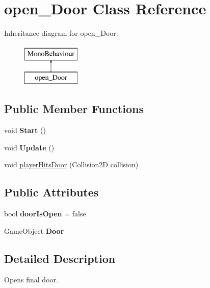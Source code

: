 \hypertarget{classopen___door}{}\section{open\+\_\+\+Door Class Reference}
\label{classopen___door}
Inheritance diagram for open\+\_\+\+Door\+:\begin{figure}[H]
\begin{center}
\leavevmode
\includegraphics[height=2.000000cm]{classopen___door}
\end{center}
\end{figure}
\subsection*{Public Member Functions}
\begin{DoxyCompactItemize}
\item 
\mbox{\label{classopen___door_a73d16144fb87c086186bd5c26b5919a5}} 
void {\bfseries Start} ()
\item 
\mbox{\label{classopen___door_a7689f551c5c3a63718e506e6e101c36f}} 
void {\bfseries Update} ()
\item 
void \mbox{\hyperlink{classopen___door_af445b9df0f862ee2c2d667d6b1f92811}{player\+Hits\+Door}} (Collision2D collision)
\end{DoxyCompactItemize}
\subsection*{Public Attributes}
\begin{DoxyCompactItemize}
\item 
\mbox{\label{classopen___door_afdfd02e742a29a8091cc062da7ebf335}} 
bool {\bfseries door\+Is\+Open} = false
\item 
\mbox{\label{classopen___door_a2d7b03a65ed29ef63bd7d17a19b57404}} 
Game\+Object {\bfseries Door}
\end{DoxyCompactItemize}


\subsection{Detailed Description}
Opens final door. 

